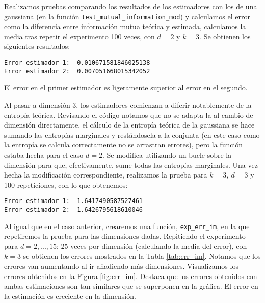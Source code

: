 \documentclass[12pt,a4paper]{report} %
\theoremstyle{definition}
\begin{document}
Realizamos pruebas comparando los resultados de los estimadores con los de una gaussiana (en la función \texttt{test\_mutual\_information\_mod}) y calculamos el error como la diferencia entre información mutua teórica y estimada, calculamos la media tras repetir el experimento 100 veces, con $d=2$ y $k=3$. Se obtienen los siguientes resultados:

\begin{lstlisting}
Error estimador 1:  0.010671581846025138
Error estimador 2:  0.007051668015342052
\end{lstlisting}

El error en el primer estimador es ligeramente superior al error en el segundo.

Al pasar a dimensión 3, los estimadores comienzan a diferir notablemente de la entropía teórica. Revisando el código notamos que no se adapta la al cambio de dimensión directamente, el cálculo de la entropía teórica de la gaussiana se hace sumando las entropías marginales y restándosela a la conjunta (en este caso como la entropía se calcula correctamente no se arrastran errores), pero la función estaba hecha para el caso $d = 2$. Se modifica utilizando un bucle sobre la dimensión para que, efectivamente, sume todas las entropías marginales. Una vez hecha la modificación correspondiente, realizamos la prueba para $k = 3,\ d = 3$ y 100 repeticiones, con lo que obtenemos:

\begin{lstlisting}
Error estimador 1:  1.6417490587527461
Error estimador 2:  1.6426795618610046
\end{lstlisting}

Al igual que en el caso anterior, crearemos una función, \texttt{exp\_err\_im}, en la que repetiremos la prueba para las dimensiones dadas. Repitiendo el experimento para $d=2,...,15$; 25 veces por dimensión (calculando la media del error), con $k=3$ se obtienen los errores mostrados en la Tabla \ref{tab:err_im}. Notamos que los errores van aumentando al ir añadiendo más dimensiones. Visualizamos los errores obtenidos en la Figura \ref{fig:err_im}. Destaca que los errores obtenidos con ambas estimaciones son tan similares que se superponen en la gráfica. El error en la estimación es creciente en la dimensión.
\end{document}
